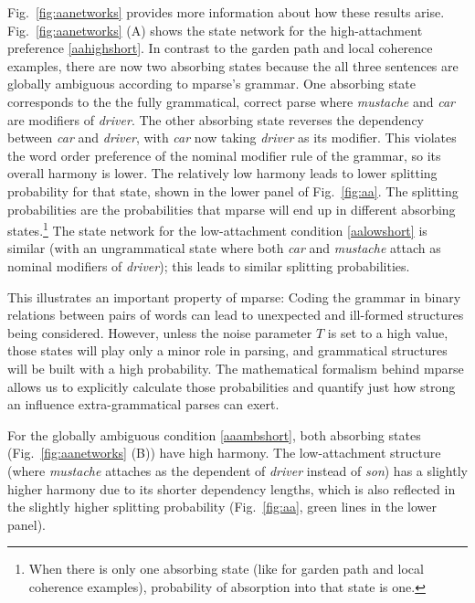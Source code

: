 \documentclass[a4paper, 12pt]{article}
\begin{document}
Fig.~\ref{fig:aanetworks} provides more information about how these results
arise. Fig.~\ref{fig:aanetworks} (A) shows the state network for the
high-attachment preference \ref{aahighshort}. In contrast to the garden path
and local coherence examples, there are now two absorbing states because the
all three sentences are globally ambiguous according to mparse's grammar. One
absorbing state corresponds to the the fully grammatical, correct parse where
\emph{mustache} and \emph{car} are modifiers of \emph{driver}. The other
absorbing state reverses the dependency between \emph{car} and \emph{driver},
with \emph{car} now taking \emph{driver} as its modifier. This violates the
word order preference of the nominal modifier rule of the grammar, so its
overall harmony is lower. The relatively low harmony leads to lower splitting
probability for that state, shown in the lower panel of Fig.~\ref{fig:aa}. The
splitting probabilities are the probabilities that mparse will end up in
different absorbing states.\footnote{When there is only one absorbing state
    (like for garden path and local coherence examples), probability of
    absorption into that state is one.} The state network for the
low-attachment condition \ref{aalowshort}
is similar (with an ungrammatical state where both \emph{car} and
\emph{mustache} attach as nominal modifiers of \emph{driver}); this leads to
similar splitting probabilities.

This illustrates an important property of mparse: Coding the grammar in
binary relations between pairs of words can lead to unexpected and ill-formed
structures being considered. However, unless the noise parameter $T$ is set to
a high value, those states will play only a minor role in parsing, and
grammatical structures will be built with a high probability. The mathematical
formalism behind mparse allows us to explicitly calculate those probabilities
and quantify just how strong an influence extra-grammatical parses can exert.

For the globally ambiguous condition \ref{aaambshort}, both absorbing states
(Fig.~\ref{fig:aanetworks} (B)) have high harmony. The low-attachment structure
(where \emph{mustache} attaches as the dependent of \emph{driver} instead of
\emph{son}) has a slightly higher harmony due to its shorter dependency
lengths, which is also reflected in the slightly higher splitting probability
(Fig.~\ref{fig:aa}, green lines in the lower panel).
\end{document}
